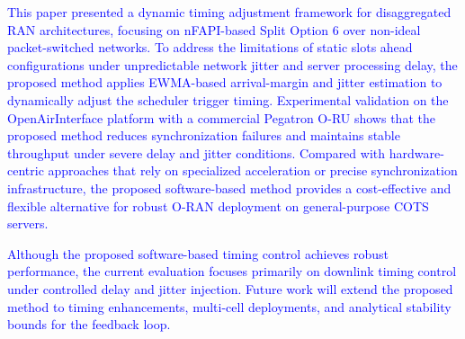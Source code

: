 \documentclass[10pt, conference, letterpaper]{IEEEtran}
\begin{document}
\textcolor{blue}{This paper presented a dynamic timing adjustment framework for disaggregated RAN architectures, focusing on nFAPI-based Split Option 6 over non-ideal packet-switched networks. To address the limitations of static slots ahead configurations under unpredictable network jitter and server processing delay, the proposed method applies EWMA-based arrival-margin and jitter estimation to dynamically adjust the scheduler trigger timing. Experimental validation on the OpenAirInterface platform with a commercial Pegatron O-RU shows that the proposed method reduces synchronization failures and maintains stable throughput under severe delay and jitter conditions. Compared with hardware-centric approaches that rely on specialized acceleration or precise synchronization infrastructure, the proposed software-based method provides a cost-effective and flexible alternative for robust O-RAN deployment on general-purpose COTS servers.}

\textcolor{blue}{Although the proposed software-based timing control achieves robust performance, the current evaluation focuses primarily on downlink timing control under controlled delay and jitter injection. Future work will extend the proposed method to timing enhancements, multi-cell deployments, and analytical stability bounds for the feedback loop.}



\end{document}
